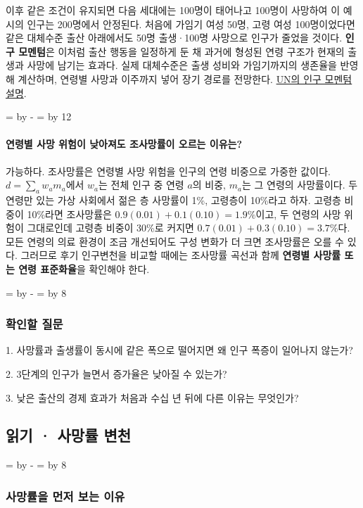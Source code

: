 \documentclass[10pt,a4paper]{article}
\newcommand{\ReserveQuestionSpace}{%
  \par\begingroup
  \dimen0=\pagegoal \advance\dimen0 by -\pagetotal
  \dimen2=\baselineskip \multiply\dimen2 by 12
  \ifdim\dimen0<\dimen2 \newpage\fi
  \endgroup}
\newcommand{\ReserveReadingSectionSpace}{%
  \par\begingroup
  \dimen0=\pagegoal \advance\dimen0 by -\pagetotal
  \dimen2=\baselineskip \multiply\dimen2 by 8
  \ifdim\dimen0<\dimen2 \newpage\fi
  \endgroup}
\begin{document}
이후 같은 조건이 유지되면 다음 세대에는 100명이 태어나고 100명이 사망하여 이 예시의 인구는 200명에서 안정된다. 처음에 가임기 여성 50명, 고령 여성 100명이었다면 같은 대체수준 출산 아래에서도 50명 출생·100명 사망으로 인구가 줄었을 것이다. \textbf{인구 모멘텀}은 이처럼 출산 행동을 일정하게 둔 채 과거에 형성된 연령 구조가 현재의 출생과 사망에 남기는 효과다. 실제 대체수준은 출생 성비와 가임기까지의 생존율을 반영해 계산하며, 연령별 사망과 이주까지 넣어 장기 경로를 전망한다. \href{https://population.un.org/wpp/assets/Files/PopFacts\_2017-4\_Population-Momentum.pdf}{UN의 인구 모멘텀 설명}.\par

\ReserveQuestionSpace
\paragraph{연령별 사망 위험이 낮아져도 조사망률이 오르는 이유는?}
가능하다. 조사망률은 연령별 사망 위험을 인구의 연령 비중으로 가중한 값이다. $d=\sum_a w_am_a$에서 $w_a$는 전체 인구 중 연령 $a$의 비중, $m_a$는 그 연령의 사망률이다. 두 연령만 있는 가상 사회에서 젊은 층 사망률이 1\%, 고령층이 10\%라고 하자. 고령층 비중이 10\%라면 조사망률은 $0.9(0.01)+0.1(0.10)=1.9\%$이고, 두 연령의 사망 위험이 그대로인데 고령층 비중이 30\%로 커지면 $0.7(0.01)+0.3(0.10)=3.7\%$다. 모든 연령의 의료 환경이 조금 개선되어도 구성 변화가 더 크면 조사망률은 오를 수 있다. 그러므로 후기 인구변천을 비교할 때에는 조사망률 곡선과 함께 \textbf{연령별 사망률 또는 연령 표준화율}을 확인해야 한다.\par

\ReserveReadingSectionSpace
\subsubsection*{확인할 질문}

1. 사망률과 출생률이 동시에 같은 폭으로 떨어지면 왜 인구 폭증이 일어나지 않는가?\par
2. 3단계의 인구가 늘면서 증가율은 낮아질 수 있는가?\par
3. 낮은 출산의 경제 효과가 처음과 수십 년 뒤에 다른 이유는 무엇인가?\par


\clearpage{}
{}
\subsection*{읽기 · 사망률 변천}
\ReserveReadingSectionSpace
\subsubsection*{사망률을 먼저 보는 이유}
\end{document}
